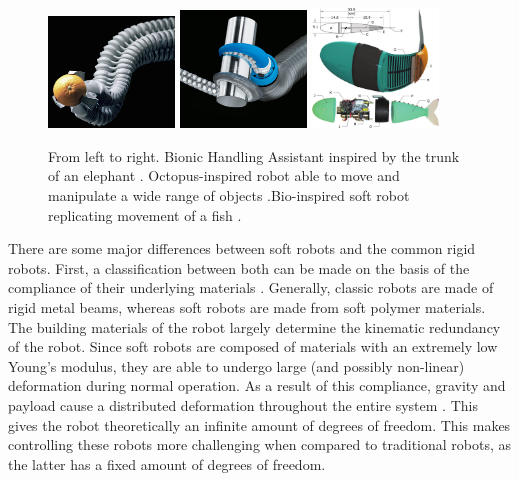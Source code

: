 \begin{figure}[H]       
    \includegraphics[width = 0.3\textwidth]{Figures/Introduction/bhasinasappel.jpg}   
    \hspace{0px}
    \includegraphics[width = 0.3\textwidth]{Figures/Introduction/tentaclegripper.jpg}
    \hspace{0px}
    \includegraphics[width = 0.3\textwidth]{Figures/Introduction/fish.jpg}
    \caption{From left to right. Bionic Handling Assistant inspired by the trunk of an elephant \cite{BHA}. Octopus-inspired robot able to move and manipulate a wide range of objects \cite{octopus}.Bio-inspired soft robot replicating movement of a fish \cite{marchese2014}.}
    \label{fig1:softexample}
\end{figure}

There are some major differences between soft robots and the common rigid robots. First, a classification between both can be made on the basis of the compliance of their underlying materials \cite{Bionics2008}. Generally, classic robots are made of rigid metal beams, whereas soft robots are made from soft polymer materials. The building materials of the robot largely determine the kinematic redundancy of the robot. Since soft robots are composed of materials with an extremely low Young's modulus, they are able to undergo large (and possibly non-linear) deformation during normal operation. As a result of this compliance, gravity and payload cause a distributed deformation throughout the entire system . This gives the robot theoretically an infinite amount of degrees of freedom. This makes controlling these robots more challenging when compared to traditional robots, as the latter has a fixed amount of degrees of freedom.


